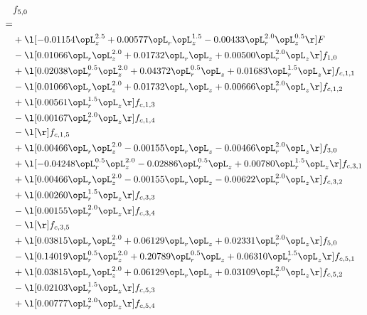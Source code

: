 \begin{alignat}{2} 
\label{eq:f_50_1} 
& f_{5,0} \nonumber \\ 
 = \\ 
& + \l[  -0.01154 \opL_z^{2.5} +  0.00577 \opL_r \opL_z^{1.5}   -0.00433 \opL_r^{2.0} \opL_z^{0.5}  \r] F \nonumber \\ 
& - \l[  0.01066 \opL_r \opL_z^{2.0} +  0.01732 \opL_r \opL_z +  0.00500 \opL_r^{2.0} \opL_z  \r] f_{1,0} \nonumber \\ 
& + \l[  0.02038 \opL_r^{0.5} \opL_z^{2.0} +  0.04372 \opL_r^{0.5} \opL_z +  0.01683 \opL_r^{1.5} \opL_z  \r] f_{c,1,1} \nonumber \\ 
& - \l[  0.01066 \opL_r \opL_z^{2.0} +  0.01732 \opL_r \opL_z +  0.00666 \opL_r^{2.0} \opL_z  \r] f_{c,1,2} \nonumber \\ 
& + \l[  0.00561 \opL_r^{1.5} \opL_z  \r] f_{c,1,3} \nonumber \\ 
& - \l[  0.00167 \opL_r^{2.0} \opL_z  \r] f_{c,1,4} \nonumber \\ 
& - \l[  \r] f_{c,1,5} \nonumber \\ 
& + \l[  0.00466 \opL_r \opL_z^{2.0}   -0.00155 \opL_r \opL_z   -0.00466 \opL_r^{2.0} \opL_z  \r] f_{3,0} \nonumber \\ 
& + \l[  -0.04248 \opL_r^{0.5} \opL_z^{2.0}   -0.02886 \opL_r^{0.5} \opL_z +  0.00780 \opL_r^{1.5} \opL_z  \r] f_{c,3,1} \nonumber \\ 
& + \l[  0.00466 \opL_r \opL_z^{2.0}   -0.00155 \opL_r \opL_z   -0.00622 \opL_r^{2.0} \opL_z  \r] f_{c,3,2} \nonumber \\ 
& + \l[  0.00260 \opL_r^{1.5} \opL_z  \r] f_{c,3,3} \nonumber \\ 
& - \l[  0.00155 \opL_r^{2.0} \opL_z  \r] f_{c,3,4} \nonumber \\ 
& - \l[  \r] f_{c,3,5} \nonumber \\ 
& + \l[  0.03815 \opL_r \opL_z^{2.0} +  0.06129 \opL_r \opL_z +  0.02331 \opL_r^{2.0} \opL_z  \r] f_{5,0} \nonumber \\ 
& - \l[  0.14019 \opL_r^{0.5} \opL_z^{2.0} +  0.20789 \opL_r^{0.5} \opL_z +  0.06310 \opL_r^{1.5} \opL_z  \r] f_{c,5,1} \nonumber \\ 
& + \l[  0.03815 \opL_r \opL_z^{2.0} +  0.06129 \opL_r \opL_z +  0.03109 \opL_r^{2.0} \opL_z  \r] f_{c,5,2} \nonumber \\ 
& - \l[  0.02103 \opL_r^{1.5} \opL_z  \r] f_{c,5,3} \nonumber \\ 
& + \l[  0.00777 \opL_r^{2.0} \opL_z  \r] f_{c,5,4} \nonumber \\ 

\end{alignat}
